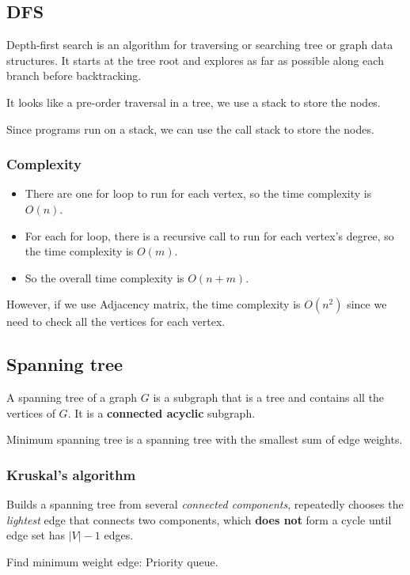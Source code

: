 \documentclass[letterpaper,12pt]{article}
\begin{document}
\subsection{DFS}
Depth-first search is an algorithm for traversing or searching tree or graph data structures. It starts at the tree root and explores as far as possible along each branch before backtracking.

It looks like a pre-order traversal in a tree, we use a stack to store the nodes.

Since programs run on a stack, we can use the call stack to store the nodes.
\begin{algorithmic}
    \Else 
    \EndIf
\EndFor
\end{algorithmic}
\subsubsection{Complexity}
\begin{itemize}
    \item There are one for loop to run for each vertex, so the time complexity is $O(n)$.
    \item For each for loop, there is a recursive call to run for each vertex's degree, so the time complexity is $O(m)$.
    \item So the overall time complexity is $O(n+m)$.
\end{itemize}

However, if we use Adjacency matrix, the time complexity is $O(n^2)$ since we need to check all the vertices for each vertex.
\subsection{Spanning tree}
A spanning tree of a graph $G$ is a subgraph that is a tree and contains all the vertices of $G$. It is a \textbf{connected acyclic} subgraph.

Minimum spanning tree is a spanning tree with the smallest sum of edge weights.
\subsubsection{Kruskal's algorithm}
Builds a spanning tree from several \textit{connected components}, repeatedly chooses the \textit{lightest} edge that connects two components, which \textbf{does not} form a cycle until edge set has $|V| - 1$ edges.
\begin{algorithmic}
        \EndIf
    \EndWhile
\end{algorithmic}
Find minimum weight edge: Priority queue.
\end{document}

